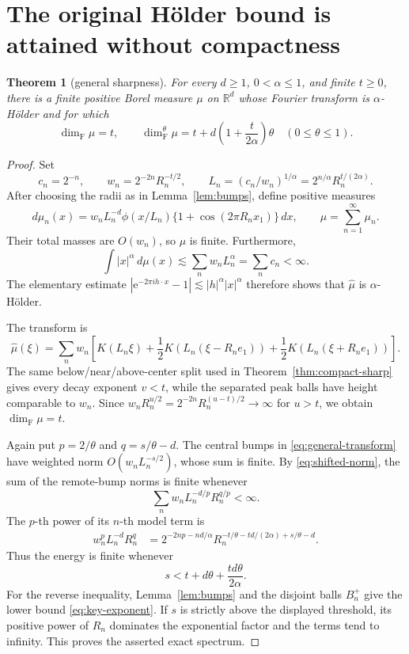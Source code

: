 \documentclass[11pt]{article}
\newtheorem{theorem}{Theorem}
\newcommand{\R}{\mathbb R}
\newcommand{\Fdim}{\dim_{\mathrm F}}
\newcommand{\e}{\mathrm e}
\begin{document}
\section{The original H\"older bound is attained without compactness}

\begin{theorem}[general sharpness]\label{thm:general-sharp}
For every $d\ge1$, $0<\alpha\le1$, and finite $t\ge0$, there is a
finite positive Borel measure $\mu$ on $\R^d$ whose Fourier transform is
\(\alpha\)-H\"older and for which
\[
 \Fdim\mu=t,
 \qquad
 \dim_{\mathrm F}^{\theta}\mu
 =t+d\left(1+\frac{t}{2\alpha}\right)\theta
 \quad(0\le\theta\le1).
\]
\end{theorem}

\begin{proof}
Set
\[
 c_n=2^{-n},\qquad
 w_n=2^{-2n}R_n^{-t/2},\qquad
 L_n=(c_n/w_n)^{1/\alpha}
     =2^{n/\alpha}R_n^{t/(2\alpha)}.
\]
After choosing the radii as in Lemma~\ref{lem:bumps}, define positive
measures
\begin{equation}\label{eq:general-measure}
 d\mu_n(x)=w_nL_n^{-d}\phi(x/L_n)
       \{1+\cos(2\pi R_nx_1)\}\,dx,
 \qquad \mu=\sum_{n=1}^\infty\mu_n.
\end{equation}
Their total masses are $O(w_n)$, so $\mu$ is finite. Furthermore,
\[
 \int |x|^\alpha\,d\mu(x)
 \lesssim\sum_n w_nL_n^\alpha
 =\sum_n c_n<\infty.
\]
The elementary estimate
\(|\e^{-2\pi i h\cdot x}-1|\lesssim |h|^\alpha|x|^\alpha\)
therefore shows that $\widehat\mu$ is $\alpha$-H\"older.

The transform is
\begin{equation}\label{eq:general-transform}
 \widehat\mu(\xi)=\sum_nw_n\left[
 K(L_n\xi)+\frac12K(L_n(\xi-R_ne_1))
             +\frac12K(L_n(\xi+R_ne_1))\right].
\end{equation}
The same below/near/above-center split used in
Theorem~\ref{thm:compact-sharp} gives every decay exponent $v<t$, while
the separated peak balls have height comparable to $w_n$. Since
\(w_nR_n^{u/2}=2^{-2n}R_n^{(u-t)/2}\to\infty\) for $u>t$, we obtain
\(\Fdim\mu=t\).

Again put $p=2/\theta$ and $q=s/\theta-d$. The central bumps in
\eqref{eq:general-transform} have weighted norm
\(O(w_nL_n^{-s/2})\), whose sum is finite. By
\eqref{eq:shifted-norm}, the sum of the remote-bump norms is finite whenever
\[
 \sum_n w_nL_n^{-d/p}R_n^{q/p}<\infty.
\]
The $p$-th power of its $n$-th model term is
\begin{align}
 w_n^pL_n^{-d}R_n^q
 &=2^{-2np-nd/\alpha}
 R_n^{-t/\theta-td/(2\alpha)+s/\theta-d}.\label{eq:key-exponent}
\end{align}
Thus the energy is finite whenever
\[
 s<t+d\theta+\frac{td\theta}{2\alpha}.
\]
For the reverse inequality, Lemma~\ref{lem:bumps} and the disjoint balls
\(B_n^+\) give the lower bound \eqref{eq:key-exponent}. If $s$ is
strictly above the displayed threshold, its positive power of $R_n$
dominates the exponential factor and the terms tend to infinity. This proves
the asserted exact spectrum.
\end{proof}
\end{document}
